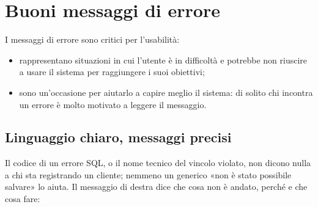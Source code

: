 \section{Buoni messaggi di errore}

I messaggi di errore sono critici per l'usabilità:

\begin{itemize}
  \item rappresentano situazioni in cui l'utente è in difficoltà e potrebbe non riuscire a usare il sistema per
        raggiungere i suoi obiettivi;
  \item sono un'occasione per aiutarlo a capire meglio il sistema: di solito chi incontra un errore è molto motivato a
        leggere il messaggio.
\end{itemize}


\subsection{Linguaggio chiaro, messaggi precisi}

Il codice di un errore SQL, o il nome tecnico del vincolo violato, non dicono nulla a chi sta registrando un cliente;
nemmeno un generico «non è stato possibile salvare» lo aiuta. Il messaggio di destra dice che cosa non è andato, perché
e che cosa fare:

